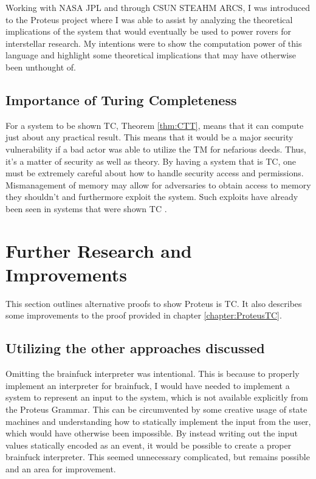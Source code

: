 Working with NASA JPL and through CSUN STEAHM ARCS, I was introduced to the Proteus project where I was able to assist by analyzing the theoretical implications of the system that would eventually be used to power rovers for interstellar research.
My intentions were to show the computation power of this language and highlight some theoretical implications that may have otherwise been unthought of.

\subsection{Importance of Turing Completeness}\label{subsec:ImportanceTC}

For a system to be shown TC, Theorem \ref{thm:CTT}, means that it can compute just about any practical result.
This means that it would be a major security vulnerability if a bad actor was able to utilize the TM for nefarious deeds.
Thus, it's a matter of security as well as theory.
By having a system that is TC, one must be extremely careful about how to handle security access and permissions.
Mismanagement of memory may allow for adversaries to obtain access to memory they shouldn't and furthermore exploit the system.
Such exploits have already been seen in systems that were shown TC \cite{SecVuln}.

\section{Further Research and Improvements}\label{sec:FurtherResImprov}

This section outlines alternative proofs to show Proteus is TC.
It also describes some improvements to the proof provided in chapter \ref{chapter:ProteusTC}.

\subsection{Utilizing the other approaches discussed}

Omitting the brainfuck interpreter was intentional.
This is because to properly implement an interpreter for brainfuck, I would have needed to implement a system to represent an input to the system, which is not available explicitly from the Proteus Grammar.
This can be circumvented by some creative usage of state machines and understanding how to statically implement the input from the user, which would have otherwise been impossible.
By instead writing out the input values statically encoded as an event, it would be possible to create a proper brainfuck interpreter.
This seemed unnecessary complicated, but remains possible and an area for improvement.

